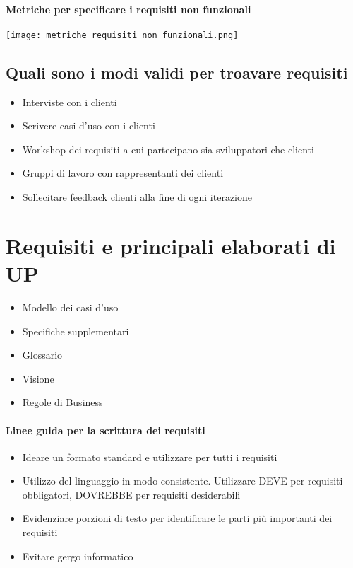\paragraph*{Metriche per specificare i requisiti non funzionali}
\begin{center}
    \texttt{[image: metriche\_requisiti\_non\_funzionali.png]}
\end{center}
\subsection{Quali sono i modi validi per troavare requisiti}
\begin{itemize}
    \item Interviste con i clienti
    \item Scrivere casi d'uso con i clienti
    \item Workshop dei requisiti a cui partecipano sia sviluppatori che clienti
    \item Gruppi di lavoro con rappresentanti dei clienti
    \item Sollecitare feedback clienti alla fine di ogni iterazione
\end{itemize}
\section{Requisiti e principali elaborati di UP}
\begin{itemize}
    \item Modello dei casi d'uso
    \item Specifiche supplementari
    \item Glossario
    \item Visione
    \item Regole di Business
\end{itemize}
\paragraph*{Linee guida per la scrittura dei requisiti}
\begin{itemize}
    \item Ideare un formato standard e utilizzare per tutti i requisiti
    \item Utilizzo del linguaggio in modo consistente. Utilizzare DEVE per requisiti
    obbligatori, DOVREBBE per requisiti desiderabili
    \item Evidenziare porzioni di testo per identificare le parti più importanti dei requisiti
    \item Evitare gergo informatico
\end{itemize}

